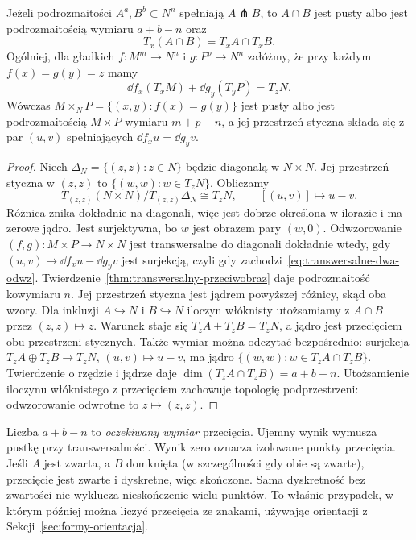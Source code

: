 \begin{twierdzenie}
\label{thm:transwersalne-przeciecie}
Jeżeli podrozmaitości $A^a,B^b\subset N^n$
spełniają $A\pitchfork B$, to $A\cap B$
jest pusty albo jest podrozmaitością wymiaru $a+b-n$ oraz
\[
 T_x(A\cap B)=T_xA\cap T_xB.
\]
Ogólniej, dla gładkich $f:M^m\to N^n$ i
$g:P^p\to N^n$ załóżmy, że przy każdym
$f(x)=g(y)=z$ mamy
\begin{equation}\label{eq:transwersalne-dwa-odwz}
 \dd f_x(T_xM)+\dd g_y(T_yP)=T_zN.
\end{equation}
Wówczas
$M\times_N P=\{(x,y):f(x)=g(y)\}$
jest pusty albo jest podrozmaitością $M\times P$ wymiaru
$m+p-n$, a jej przestrzeń styczna składa się z
par $(u,v)$ spełniających $\dd f_xu=\dd g_yv$.
\end{twierdzenie}
\begin{proof}
Niech $\Delta_N=\{(z,z):z\in N\}$ będzie diagonalą
w $N\times N$. Jej przestrzeń styczna w $(z,z)$
to $\{(w,w):w\in T_zN\}$. Obliczamy
\[
 T_{(z,z)}(N\times N)/T_{(z,z)}\Delta_N
       \cong T_zN,\qquad [(u,v)]\longmapsto u-v.
\]
Różnica znika dokładnie na diagonali, więc jest
dobrze określona w ilorazie i ma zerowe jądro.
Jest surjektywna, bo $w$ jest obrazem pary $(w,0)$.
Odwzorowanie $(f,g):M\times P\to N\times N$
jest transwersalne do diagonali dokładnie wtedy,
gdy $(u,v)\mapsto\dd f_xu-\dd g_yv$ jest surjekcją,
czyli gdy zachodzi~\eqref{eq:transwersalne-dwa-odwz}.
Twierdzenie~\ref{thm:transwersalny-przeciwobraz}
daje podrozmaitość kowymiaru $n$.
Jej przestrzeń styczna jest jądrem powyższej
różnicy, skąd oba wzory. Dla inkluzji
$A\hookrightarrow N$ i $B\hookrightarrow N$
iloczyn włóknisty utożsamiamy z $A\cap B$
przez $(z,z)\mapsto z$. Warunek staje się
$T_zA+T_zB=T_zN$, a jądro jest przecięciem
obu przestrzeni stycznych.
Także wymiar można odczytać bezpośrednio:
surjekcja $T_zA\oplus T_zB\to T_zN$,
$(u,v)\mapsto u-v$, ma jądro
$\{(w,w):w\in T_zA\cap T_zB\}$.
Twierdzenie o rzędzie i jądrze daje
$\dim(T_zA\cap T_zB)=a+b-n$.
Utożsamienie iloczynu włóknistego z przecięciem zachowuje
topologię podprzestrzeni: odwzorowanie odwrotne to $z\mapsto(z,z)$.
\end{proof}

\begin{uwaga}
Liczba $a+b-n$ to \emph{oczekiwany wymiar}
przecięcia. Ujemny wynik wymusza pustkę przy
transwersalności. Wynik zero oznacza izolowane
punkty przecięcia. Jeśli $A$ jest zwarta, a $B$ domknięta
(w szczególności gdy obie są zwarte), przecięcie jest
zwarte i dyskretne, więc skończone. Sama dyskretność
bez zwartości nie wyklucza nieskończenie wielu punktów.
To właśnie przypadek, w którym później można
liczyć przecięcia ze znakami, używając orientacji
z Sekcji~\ref{sec:formy-orientacja}.
\end{uwaga}

